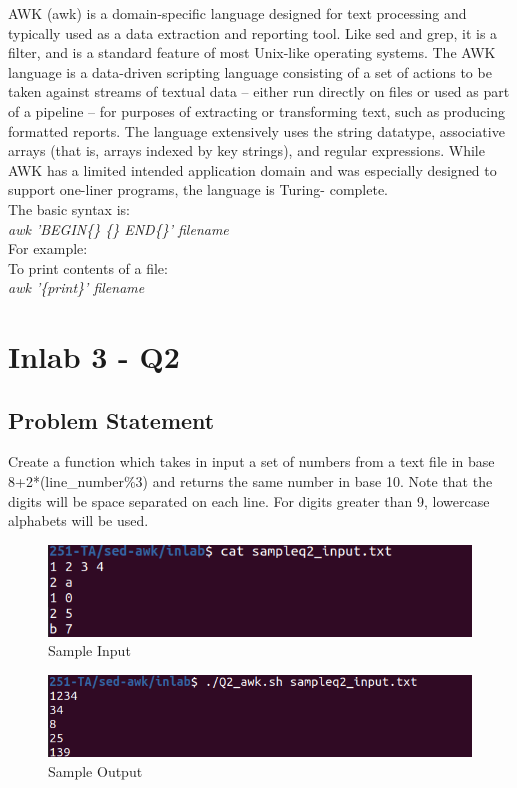 \documentclass[12pt]{article}
\begin{document}
{
\begin{minipage}{\textwidth}
    AWK (awk) is a domain-specific language designed for text processing and 
    typically used as a data extraction and reporting tool. Like sed and grep, 
    it is a filter, and is a standard feature of most Unix-like operating 
    systems.
    The AWK language is a data-driven scripting language consisting of a set of 
    actions to be taken against streams of textual data – either run directly on files
    or used as part of a pipeline – for purposes of extracting or transforming text, 
    such as producing formatted reports. The language extensively uses the string 
    datatype, associative arrays (that is, arrays indexed by key strings), and 
    regular expressions. While AWK has a limited intended application domain and was 
    especially designed to support one-liner programs, the language is Turing-
    complete.\\
    The basic syntax is:\\
    \emph{awk 'BEGIN\{\} \{\} END\{\}' filename}\\
    For example:\\
    To print contents of a file:\\
    \emph{awk '\{print\}' filename}
\end{minipage}
}
\newpage

\section{Inlab 3 - Q2}

\subsection{Problem Statement}
Create a function which takes in input a set of numbers from a text file 
in base 8+2*(line\_number\%3) 
and returns the same number in base 10. 
Note that the digits will be space separated on each line. 
For digits greater than 9, lowercase alphabets will be used.
\begin{figure}[h]
    \includegraphics[width=\textwidth]{inlab3_sample_input.png}
    \caption[]{Sample Input}
\end{figure}
\begin{figure}[h]
    \includegraphics[width=\textwidth]{inlab3_sample_output.png}
    \caption[]{Sample Output}
\end{figure}
\end{document}
